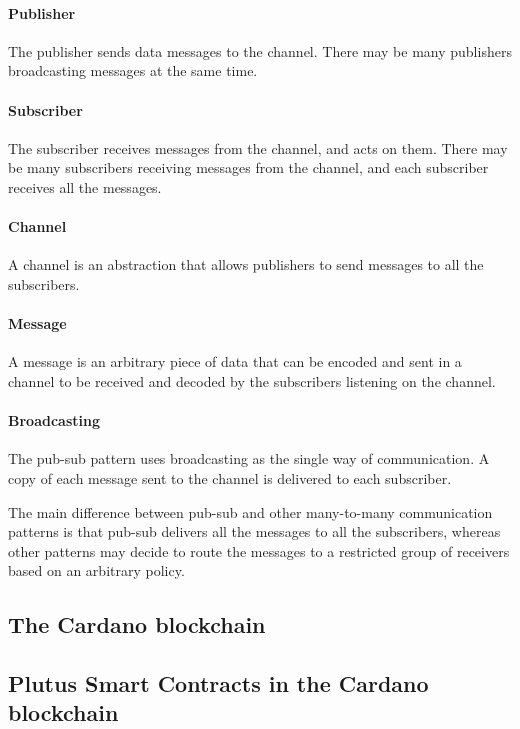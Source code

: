 \documentclass{article}
\begin{document}
\paragraph{Publisher}
The publisher sends data messages to the channel. There may be many publishers broadcasting messages at the same time.

\paragraph{Subscriber}
The subscriber receives messages from the channel, and acts on them. There may be many subscribers receiving messages from the channel, and each subscriber receives all the messages.

\paragraph{Channel}
A channel is an abstraction that allows publishers to send messages to all the subscribers.

\paragraph{Message}
A message is an arbitrary piece of data that can be encoded and sent in a channel to be received and decoded by the subscribers listening on the channel.

\paragraph{Broadcasting}
The pub-sub pattern uses broadcasting as the single way of communication. A copy of each message sent to the channel is delivered to each subscriber.

The main difference between pub-sub and other many-to-many communication patterns is that pub-sub delivers all the messages to all the subscribers, whereas other patterns may decide to route the messages to a restricted group of receivers based on an arbitrary policy.


\subsection{The Cardano blockchain}

\subsection{Plutus Smart Contracts in the Cardano blockchain}
\end{document}
